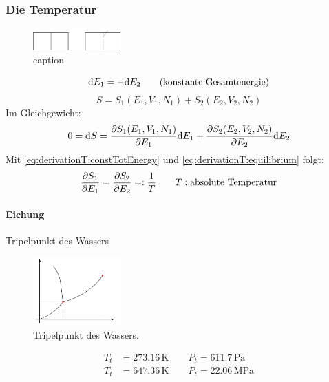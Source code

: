 \subsubsection{Die Temperatur}
\begin{figure}[H]
    \begin{center}
        \includegraphics[width=0.3\textwidth]{../img/derivationT.pdf}
        \caption{caption}  %
        \label{img:derivationT}
    \end{center}
\end{figure}
\begin{equation}
    \label{eq:derivationT:constTotEnergy}
	\mathrm{d} E_1 = - \mathrm{d} E_2 \qquad \text{(konstante Gesamtenergie)}
\end{equation}
\begin{equation}
    S = S_1(E_1, V_1, N_1) + S_2 (E_2, V_2, N_2)
\end{equation}
Im Gleichgewicht:
\begin{equation}
    \label{eq:derivationT:equilibrium}
    0 = \mathrm{d} S = \frac{\partial S_1(E_1, V_1, N_1)}{\partial E_1} \mathrm{d} E_1 + \frac{\partial S_2 (E_2, V_2, N_2)}{\partial E_2} \mathrm{d} E_2
\end{equation}
Mit \autoref{eq:derivationT:constTotEnergy} und \autoref{eq:derivationT:equilibrium} folgt:
\begin{equation}
    \frac{\partial S_1}{\partial E_1} = \frac{\partial S_2}{\partial E_2} =: \frac{1}{T} \qquad T:\text{absolute Temperatur}
\end{equation}

\paragraph{Eichung} Tripelpunkt des Wassers
\begin{figure}[H]
\begin{center}
  \includegraphics[width=0.3\textwidth]{../img/tripelpoint.pdf}
  \caption{Tripelpunkt des Wassers.}
  \label{img:tripelpoint}
\end{center}
\end{figure}
\begin{equation}
    \begin{split}
        T_t &= 273.16 \, \text{K} \qquad P_t = 611.7 \, \text{Pa} \\
        T_t &= 647.36 \, \text{K} \qquad P_t = 22.06 \, \text{MPa}
    \end{split}
\end{equation}

